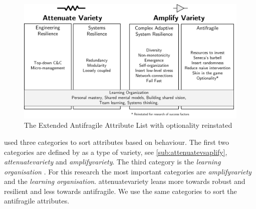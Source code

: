 \begin{figure}[H]
	\centering
	\includegraphics[width=0.8\linewidth]{images/eaalbwincludingoptionality}
	\caption[The Extended Antifragile Attribute List \parencite{Botjes2021} with optionality reinstated]{The Extended Antifragile Attribute List \parencite{Botjes2021} with optionality reinstated}
	\label{fig:eaalbwincludingoptionality}
\end{figure}
\textcite{Botjes2021} used three categories to sort attributes based on behaviour. The first two categories are defined by \textcite[p.~4]{Botjes2021} as a type of variety, see \cref{sub:attenuatevsaplify}, \textit{\gls{attenuatevariety}} and \textit{\gls{amplifyvariety}}. The third category is the \textit{learning organisation} \parencite[p.~4]{Botjes2021}. For this research the most important categories are \textit{\gls{amplifyvariety}} and the \textit{learning organisation}. \Gls{attenuatevariety} leans more towards \gls{robust} and \gls{resilient} and less towards \gls{antifragile}. We use the same categories to sort the \gls{antifragile} attributes.
